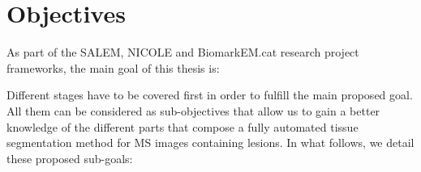 \section{Objectives}
\label{sec:objectives}

As part of the SALEM, NICOLE and BiomarkEM.cat research project frameworks, the main goal of this thesis is: 

\begin{center}
\end{center}

Different stages have to be covered first in order to fulfill the main proposed goal. All them can be considered as sub-objectives that allow us to gain a better knowledge of the different parts that compose a fully automated tissue segmentation method for MS images containing lesions. In what follows, we detail these proposed sub-goals: 

